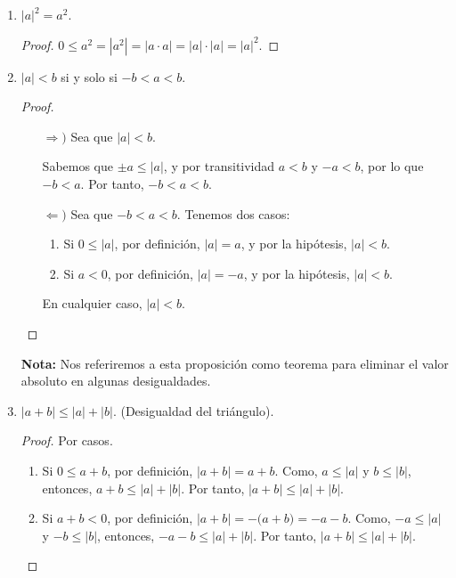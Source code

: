 \documentclass[11pt]{article}
\begin{document}
\begin{enumerate}[label=\alph*)]
\item $|a|^2=a^2$.
\begin{proof} 
 $0 \leq a^2 = |a^2|= |a\cdot a|=|a| \cdot |a|= |a|^2$. \qedhere
\end{proof}

\item $|a|<b$ si y solo si $-b<a<b$.

\begin{proof} \leavevmode
 \begin{itemize}
  \item[$\Rightarrow)$] Sea que $|a|<b$.
  
  Sabemos que $\pm a \leq |a|$, y por transitividad $a<b$ y $-a<b$, por lo que $-b<a$. Por tanto, $-b<a<b$.
  \item[$\Leftarrow)$] Sea que $-b<a<b$. Tenemos dos casos: \begin{enumerate}[label=\roman*)]
   \item Si $0\leq |a|$, por definición, $|a|=a$, y por la hipótesis, $|a|<b$.
   \item Si $a<0$, por definición, $|a|=-a$, y por la hipótesis, $|a|<b$.
  \end{enumerate} En cualquier caso, $|a|<b$. \qedhere 
 \end{itemize}
\end{proof}

\textbf{Nota:} Nos referiremos a esta proposición como teorema para eliminar el valor absoluto en algunas desigualdades.

 \item $|a+b|\leq |a|+|b|$. (Desigualdad del triángulo).

 \begin{proof} 
  Por casos.
  \begin{enumerate}[label=\roman*)]
   \item Si $0 \leq a+b$, por definición, $|a+b|=a+b$. Como, $a \leq |a|$ y $b \leq |b|$, entonces, $a+b \leq |a|+|b|$. Por tanto, $|a+b| \leq |a|+|b|$.
   \item Si $a+b<0$, por definición, $|a+b|=-\bigl(a+b\bigr)=-a-b$. Como, $-a \leq |a|$ y $-b \leq |b|$, entonces, $-a-b \leq |a|+|b|$. Por tanto, $|a+b| \leq |a|+|b|$. \qedhere
  \end{enumerate} 
 \end{proof}
%


\end{enumerate}
\end{document}
